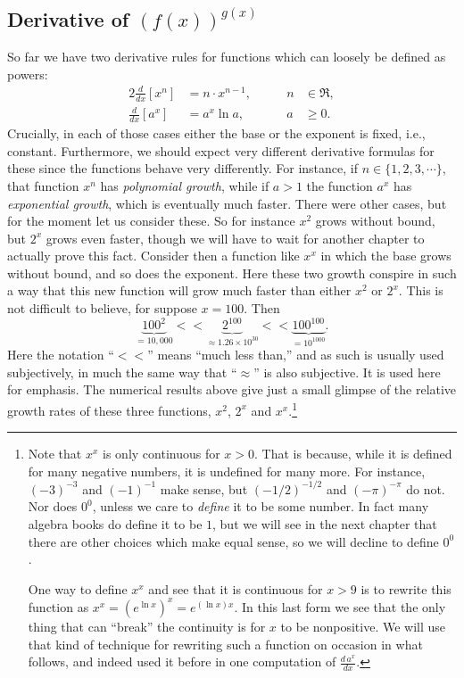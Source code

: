 \subsection{Derivative of $(f(x))^{g(x)}$}

So far we have two derivative rules for functions which can loosely
be defined as powers:
\begin{alignat*}{2}
\frac{d}{dx}\left[x^n\right]&=n\cdot x^{n-1},&\qquad n&\in\Re,\\
\frac{d}{dx}\left[a^x\right]&=a^x\ln a,&\qquad a&\ge0.\end{alignat*}
Crucially, in each of those cases either the base or the exponent is fixed,
i.e., constant.
Furthermore, we should expect very different
derivative formulas for these since
the functions behave very differently.
For instance, if $n\in\{1,2,3,\cdots\}$, that function $x^n$
has {\it polynomial growth}, while if $a>1$ the function $a^x$ has
{\it exponential growth}, which is eventually
much faster.  There were other cases,
but for the moment let us consider these.  So for instance
$x^2$ grows without bound,
but $2^x$ grows even faster, though we will have to wait for
another chapter to actually prove this fact.  Consider then
a function like $x^x$ in which the base grows without bound, and so
does the exponent.  Here these two growth conspire
in such a way that this new function will grow much faster than
either $x^2$ or $2^x$.  This is not difficult to believe, for suppose
$x=100$.  Then
$$\underbrace{100^2}_{=10,000}
<<\underbrace{2^{100}}_{\approx1.26\times10^{30}}
<<\underbrace{100^{100}}_{=10^{1000}}.$$
Here the notation ``$<<$'' means ``much less than,'' and as such is
usually used subjectively, in much the same way that ``$\approx$''
is also subjective.  It is used here for emphasis.  The numerical
results above give just a small glimpse of the relative growth rates of these
three functions, $x^2$, $2^x$ and $x^x$.\footnote{%
Note that $x^x$ is only continuous for $x>0$.  That is because, while
it is defined for many negative numbers, it is undefined for many more.
For instance, $(-3)^{-3}$ and $(-1)^{-1}$ make sense, but $(-1/2)^{-1/2}$
and $(-\pi)^{-\pi}$ do not.  Nor does $0^0$, unless we care to {\it define}
it to be some number.  In fact many algebra books do define it to be $1$,
but we will see in the next chapter that there are other choices which 
make equal sense, so we will decline to define $0^0$.

One way to define $x^x$ and see that it is continuous for
$x>9$ is to rewrite this function
as $x^x=\left(e^{\ln x}\right)^x=e^{(\ln x)x}$.  In this last form
we see that the only thing that can ``break'' the continuity
is for $x$ to be nonpositive.  We will use that 
kind of technique for rewriting such a function
on occasion in what follows, and indeed used it
before in one computation of $\frac{d\,a^x}{dx}$.
} 

